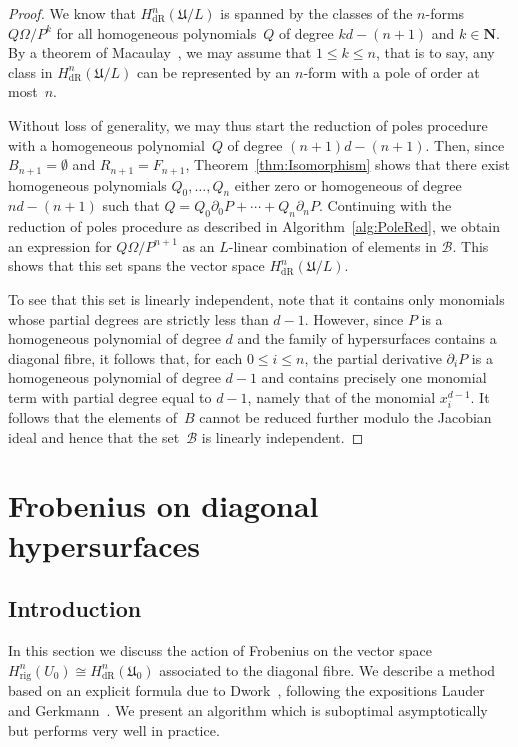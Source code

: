 \documentclass[a4paper,11pt]{article}
\numberwithin{equation}{section}
\newcommand{\NN}{\mathbf{N}} %
\providecommand{\HdR}{H_{\text{dR}}}    %
\providecommand{\Hrig}{H_{\text{rig}}}  %
\providecommand{\cB}{\mathcal{B}} %
\theoremstyle{definition}
\begin{document}
\begin{proof}
We know that $\HdR^n(\mathfrak{U}/L)$ is spanned by the classes of the 
$n$-forms $Q \Omega / P^k$ for all homogeneous polynomials~$Q$ of degree 
$kd-(n+1)$ and $k \in \NN$.  
By a theorem of Macaulay~\citep[\S 4, (4.11)]{Griffiths1969}, 
we may assume that $1 \leq k \leq n$, that is to say, any class in 
$\HdR^n(\mathfrak{U}/L)$ can be represented by an $n$-form with a pole 
of order at most~$n$.

Without loss of generality, we may thus start the reduction of poles 
procedure with a homogeneous polynomial~$Q$ of degree $(n+1)d-(n+1)$.  Then, 
since $B_{n+1} = \emptyset$ and $R_{n+1} = F_{n+1}$, 
Theorem~\ref{thm:Isomorphism} shows that there exist homogeneous polynomials 
$Q_0, \dotsc, Q_n$ either zero or homogeneous of degree $nd-(n+1)$ such that 
$Q = Q_0 \partial_0 P + \dotsb + Q_n \partial_n P$.  Continuing with the 
reduction of poles procedure as described in Algorithm~\ref{alg:PoleRed}, 
we obtain an expression for $Q \Omega / P^{n+1}$ as an $L$-linear combination 
of elements in $\cB$.  This shows that this set spans the vector space 
$\HdR^n(\mathfrak{U}/L)$.

To see that this set is linearly independent, note that it contains only 
monomials whose partial degrees are strictly less than $d-1$.  However, since 
$P$ is a homogeneous polynomial of degree $d$ and the family of hypersurfaces 
contains a diagonal fibre, it follows that, for each $0 \leq i \leq n$, the 
partial derivative $\partial_i P$ is a homogeneous polynomial of degree $d-1$ 
and contains precisely one monomial term with partial degree equal to $d-1$, 
namely that of the monomial $x_i^{d-1}$.  It follows that the elements of~$B$ 
cannot be reduced further modulo the Jacobian ideal and hence that the 
set~$\cB$ is linearly independent.
\end{proof}


\section{Frobenius on diagonal hypersurfaces}

\subsection{Introduction}

In this section we discuss the action of Frobenius on the vector 
space $\Hrig^{n}(U_0) \cong \HdR^{n}(\mathfrak{U}_0)$ associated 
to the diagonal fibre.  We describe a method based on an explicit 
formula due to Dwork~\citep[\S 4]{Dwork1964}, following the expositions 
Lauder~\citep[\S 6]{Lauder2004b} and Gerkmann~\citep[\S 4.4]{Gerkmann2007}. 
We present an algorithm which is suboptimal asymptotically but 
performs very well in practice.
\end{document}
